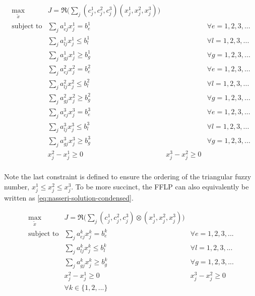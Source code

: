 \documentclass[ee,thesis]{usuthesis}
\begin{document}
\begin{equation}
\label{eq:nasseri-solution}
\begin{array}{lclc}
\underset{{\tilde{x}}}{\text{max}}   & J = \mathfrak{R}\Big(\sum_j (c_j^1,c_j^2,c_j^3)(x_j^1,x_j^2,x_j^3)\Big) &\\
\text{subject to} & \sum_j a_{ej}^1 x_j^1 = b_e^1 & & \forall e = 1,2,3,... \\
                  & \sum_j a_{lj}^1 x_j^1 \le b_l^1 & & \forall l = 1,2,3,... \\
                  & \sum_j a_{gj}^1 x_j^1 \ge b_g^1  & & \forall g = 1,2,3,... \\
                  & \sum_j a_{ej}^2 x_j^2 = b_e^2 & & \forall e = 1,2,3,... \\
                  & \sum_j a_{lj}^2 x_j^2 \le b_l^2 & & \forall l = 1,2,3,... \\
                  & \sum_j a_{gj}^2 x_j^2 \ge b_g^2  & & \forall g = 1,2,3,... \\
                  & \sum_j a_{ej}^3 x_j^3 = b_e^3 & & \forall e = 1,2,3,... \\
                  & \sum_j a_{lj}^3 x_j^3 \le b_l^3 & & \forall l = 1,2,3,... \\
                  & \sum_j a_{gj}^3 x_j^3 \ge b_g^3  & & \forall g = 1,2,3,... \\
                  & x_j^2 - x_j^1 \ge 0         & x_j^3 - x_j^2 \ge 0 & \\
\end{array}
\end{equation}

\noindent Note the last constraint is defined to ensure the ordering of the triangular fuzzy number, \(x_j^1 \le x_j^2 \le x_j^3\).
To be more succinct, the FFLP can also equivalently be written as \ref{eq:nasseri-solution-condensed}.

\begin{equation}
\label{eq:nasseri-solution-condensed}
\begin{array}{llc}
\underset{{\tilde{x}}}{\text{max}} & J = \mathfrak{R}\Big(\sum_j (c_j^1,c_j^2,c_j^3) \otimes (x_j^1,x_j^2,x_j^3)\Big) &\\
\text{subject to} & \sum_j a_{ej}^k x_j^k = b_e^k &  \forall e = 1,2,3,... \\
                  & \sum_j a_{lj}^k x_j^k \le b_l^k &  \forall l = 1,2,3,... \\
                  & \sum_j a_{gj}^k x_j^k \ge b_g^k  &  \forall g = 1,2,3,... \\
                  & x_j^2 - x_j^1 \ge 0         & x_j^3 - x_j^2 \ge 0 \\
                  & \forall k \in \{1,2,...\}        &                  \\
\end{array}
\end{equation}
\end{document}
